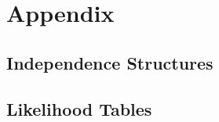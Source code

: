 \chapter{Appendix}

\section{Independence Structures}
\label{sec:apdx:struc}
\section{Likelihood Tables}
\label{sec:apdx:table}

